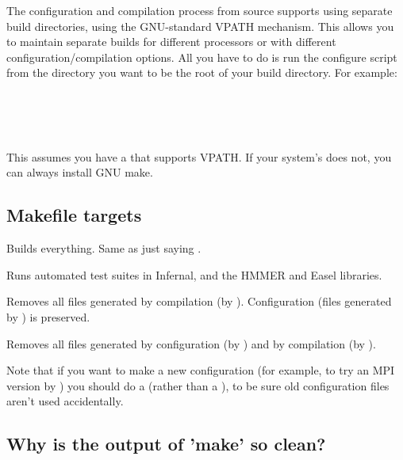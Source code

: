 The configuration and compilation process from source supports using
separate build directories, using the GNU-standard VPATH
mechanism. This allows you to maintain separate builds for different
processors or with different configuration/compilation options. All
you have to do is run the configure script from the directory you want
to be the root of your build directory.  For example:

\\
\\
\\

This assumes you have a  that supports VPATH. If your
system's  does not, you can always install GNU make.

\subsection{Makefile targets}

\begin{sreitems}{}

\item[\emprog{all}]
  Builds everything. Same as just saying .

\item[\emprog{check}]
  Runs automated test suites in Infernal, and the HMMER and Easel
  libraries.

\item[\emprog{clean}]
  Removes all files generated by compilation (by
  ). Configuration (files generated by
  ) is preserved.

\item[\emprog{distclean}]
  Removes all files generated by configuration (by )
  and by compilation (by ). 

  Note that if you want to make a new configuration (for example, to
  try an MPI version by ) you
  should do a  (rather than a ), to be sure old configuration files aren't used
  accidentally.
\end{sreitems}

\subsection{Why is the output of 'make' so clean?}

